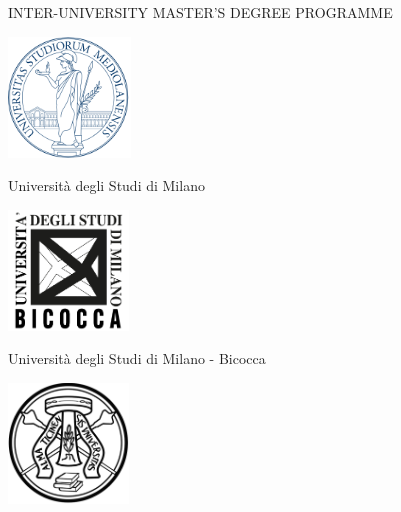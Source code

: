 \frenchspacing
\frontmatter



\begin{titlepage}

\thispagestyle{empty}

\begin{center}
\vskip 1cm
{\large INTER-UNIVERSITY MASTER'S DEGREE PROGRAMME}

\vskip 1cm
\begin{minipage}[t]{18cm}%
\begin{center}%
\begin{minipage}[t]{4cm}%
\begin{center}
\includegraphics[height=3.2cm]{logos/logo-unimi}%

\Large Universit\`a degli Studi di Milano
\end{center}
\end{minipage}%
\hspace{1.5cm}%
\begin{minipage}[t]{6cm}%
\begin{center}
\includegraphics[height=3.2cm]{logos/logo-unimib-clear}%

\Large Universit\`a degli Studi di Milano - Bicocca
\end{center}
\end{minipage}%
\hspace{1.5cm}%
\begin{minipage}[t]{4cm}%
\begin{center}
\includegraphics[height=3.2cm]{logos/logo-unipv-bw}


\end{center}
\end{minipage}
\end{center}
\end{minipage}
\end{center}
\end{titlepage}
